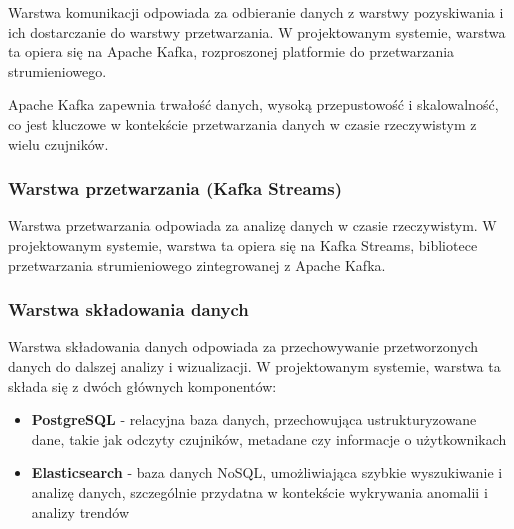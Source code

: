 Warstwa komunikacji odpowiada za odbieranie danych z warstwy pozyskiwania i ich dostarczanie do warstwy przetwarzania.
W projektowanym systemie, warstwa ta opiera się na Apache Kafka, rozproszonej platformie do przetwarzania strumieniowego.


Apache Kafka zapewnia trwałość danych, wysoką przepustowość i skalowalność, co jest kluczowe w kontekście przetwarzania danych w czasie rzeczywistym z wielu czujników.

\subsubsection{Warstwa przetwarzania (Kafka Streams)}
\label{subsubsec:warstwa_przetwarzania}

Warstwa przetwarzania odpowiada za analizę danych w czasie rzeczywistym. W projektowanym systemie, warstwa ta opiera się na Kafka Streams, bibliotece przetwarzania
strumieniowego zintegrowanej z Apache Kafka.


%

\subsubsection{Warstwa składowania danych}
\label{subsubsec:warstwa_skladowania}

Warstwa składowania danych odpowiada za przechowywanie przetworzonych danych do dalszej analizy i wizualizacji. W projektowanym systemie, warstwa ta składa się z dwóch głównych komponentów:

\begin{itemize}
    \item \textbf{PostgreSQL} - relacyjna baza danych, przechowująca ustrukturyzowane dane, takie jak odczyty czujników, metadane czy informacje o użytkownikach
    \item \textbf{Elasticsearch} - baza danych NoSQL, umożliwiająca szybkie wyszukiwanie i analizę danych, szczególnie przydatna w kontekście wykrywania anomalii i analizy trendów
\end{itemize}

